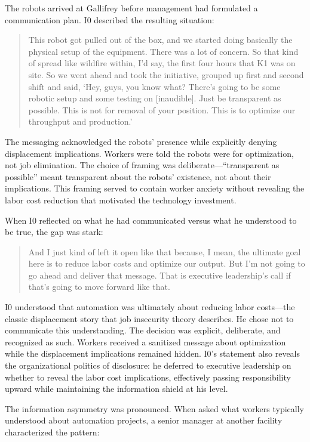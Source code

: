 \documentclass[12pt]{article}
\begin{document}
The robots arrived at Gallifrey before management had formulated a communication plan. I0 described the resulting situation:

\begin{quote}
This robot got pulled out of the box, and we started doing basically the physical setup of the equipment. There was a lot of concern. So that kind of spread like wildfire within, I'd say, the first four hours that K1 was on site. So we went ahead and took the initiative, grouped up first and second shift and said, `Hey, guys, you know what? There's going to be some robotic setup and some testing on [inaudible]. Just be transparent as possible. This is not for removal of your position. This is to optimize our throughput and production.'
\end{quote}

The messaging acknowledged the robots' presence while explicitly denying displacement implications. Workers were told the robots were for optimization, not job elimination. The choice of framing was deliberate---``transparent as possible'' meant transparent about the robots' existence, not about their implications. This framing served to contain worker anxiety without revealing the labor cost reduction that motivated the technology investment.

When I0 reflected on what he had communicated versus what he understood to be true, the gap was stark:

\begin{quote}
And I just kind of left it open like that because, I mean, the ultimate goal here is to reduce labor costs and optimize our output. But I'm not going to go ahead and deliver that message. That is executive leadership's call if that's going to move forward like that.
\end{quote}

I0 understood that automation was ultimately about reducing labor costs---the classic displacement story that job insecurity theory describes. He chose not to communicate this understanding. The decision was explicit, deliberate, and recognized as such. Workers received a sanitized message about optimization while the displacement implications remained hidden. I0's statement also reveals the organizational politics of disclosure: he deferred to executive leadership on whether to reveal the labor cost implications, effectively passing responsibility upward while maintaining the information shield at his level.

The information asymmetry was pronounced. When asked what workers typically understood about automation projects, a senior manager at another facility characterized the pattern:
\end{document}
